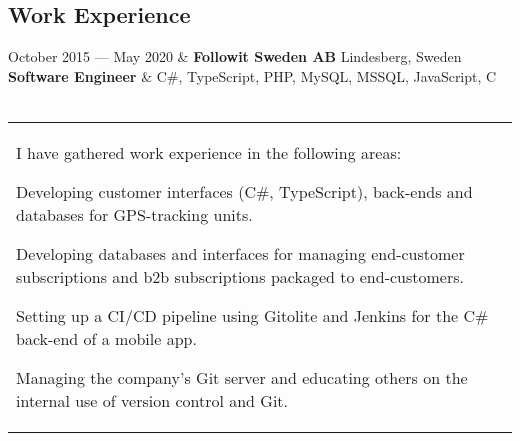 \documentclass{cv-stylish}
\begin{document}
\begin{center} %








\section{Work Experience}

\begin{JobTable}
  October 2015 --- May 2020 & \textbf{Followit Sweden AB} \hfill
Lindesberg, Sweden \\[3pt]
  \hspace{5mm} \textbf{Software Engineer}
  & \hfill C\#, TypeScript, PHP, MySQL, MSSQL, JavaScript, C \\
   \\
\end{JobTable}
\begin{tabularx}{0.97\linewidth}{X}
 I have gathered work experience in the following areas:
\begin{compactitem}
  \item Developing customer interfaces (C\#, TypeScript), back-ends
    and databases for GPS-tracking units.
  \item Developing databases and interfaces for managing end-customer
    subscriptions and b2b subscriptions packaged to end-customers.
  \item Setting up  a CI/CD pipeline using Gitolite and Jenkins for the C\#
    back-end of a mobile app.
  \item Managing the company's Git server and educating others on the
    internal use of version control and Git.
\end{compactitem}
\end{tabularx}


\end{center}
\end{document}
